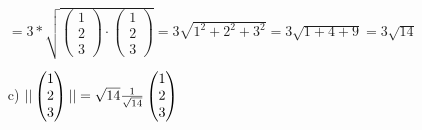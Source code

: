 \begin{enumerate}
\begin{math}
            =3*\sqrt{
                \begin{pmatrix}
                    1\\
                    2\\
                    3
                \end{pmatrix}
                \cdot
                \begin{pmatrix}
                    1\\
                    2\\
                    3
                \end{pmatrix}
            }
            =3\sqrt{1^2+2^2+3^2}
            =3\sqrt{1+4+9}
            =3\sqrt{14}
        \end{math}
    \item[c)]
        \begin{math}
            ||\begin{pmatrix}
                1\\
                2\\
                3
            \end{pmatrix}||
            =\sqrt{14}
            \\
            \frac{1}{\sqrt{14}}
            \begin{pmatrix}
                1\\
                2\\
                3
            \end{pmatrix}
        \end{math}
\end{enumerate}